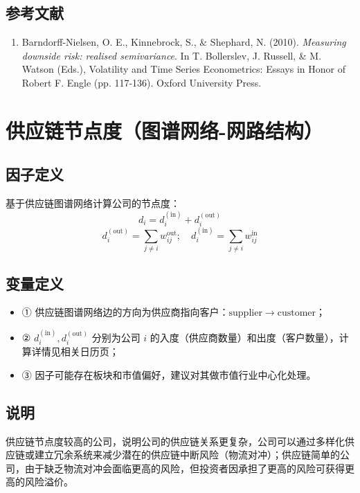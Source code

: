 \documentclass{article}
\begin{document}
\subsection{参考文献}
\begin{enumerate}
    \item Barndorff-Nielsen, O. E., Kinnebrock, S., \& Shephard, N. (2010). \textit{Measuring downside risk: realised semivariance}. In T. Bollerslev, J. Russell, \& M. Watson (Eds.), Volatility and Time Series Econometrics: Essays in Honor of Robert F. Engle (pp. 117-136). Oxford University Press.
\end{enumerate}

\section{供应链节点度（图谱网络-网路结构）}

\subsection{因子定义}
基于供应链图谱网络计算公司的节点度：
\begin{equation}
    d_i = d_i^{(\mathrm{in})} + d_i^{(\mathrm{out})}
\end{equation}
\begin{equation}
    d_i^{(\mathrm{out})} = \sum_{j \neq i} w_{ij}^{\mathrm{out}}; \quad d_i^{(\mathrm{in})} = \sum_{j \neq i} w_{ij}^{\mathrm{in}}
\end{equation}

\subsection{变量定义}
\begin{itemize}
    \item ① 供应链图谱网络边的方向为供应商指向客户：\(\mathrm{supplier} \rightarrow \mathrm{customer}\)；
    \item ② \( d_i^{(\mathrm{in})}, d_i^{(\mathrm{out})} \) 分别为公司 \( i \) 的入度（供应商数量）和出度（客户数量），计算详情见相关日历页；
    \item ③ 因子可能存在板块和市值偏好，建议对其做市值行业中心化处理。
\end{itemize}

\subsection{说明}
供应链节点度较高的公司，说明公司的供应链关系更复杂，公司可以通过多样化供应链或建立冗余系统来减少潜在的供应链中断风险（物流对冲）；供应链简单的公司，由于缺乏物流对冲会面临更高的风险，但投资者因承担了更高的风险可获得更高的风险溢价。
\end{document}
